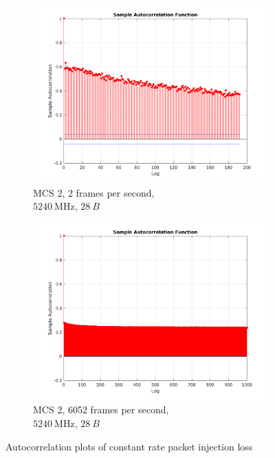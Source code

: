 \documentclass[10pt,a4paper]{article}
\begin{document}
\begin{figure}
	\begin{subfigure}[b]{0.45\textwidth}
		\includegraphics[width=\textwidth]{./fig/maes-1456822952-5240-2-2-modpc.png}
		\caption{MCS 2, 2 frames per second,\\ $\SI{5240}{\mega\hertz}$, $\SI{28}{B}$}\label{fig:acrpil:c}
	\end{subfigure}
	\begin{subfigure}[b]{0.45\textwidth}
		\includegraphics[width=\textwidth]{./fig/maes-1456822952-5240-20000-2-modpc.png}
		\caption{MCS 2, 6052 frames per second,\\ $\SI{5240}{\mega\hertz}$, $\SI{28}{B}$}\label{fig:acrpil:d}
	\end{subfigure}
	\caption{Autocorrelation plots of constant rate packet injection loss}\label{fig:acrpil}
\end{figure}
\end{document}
